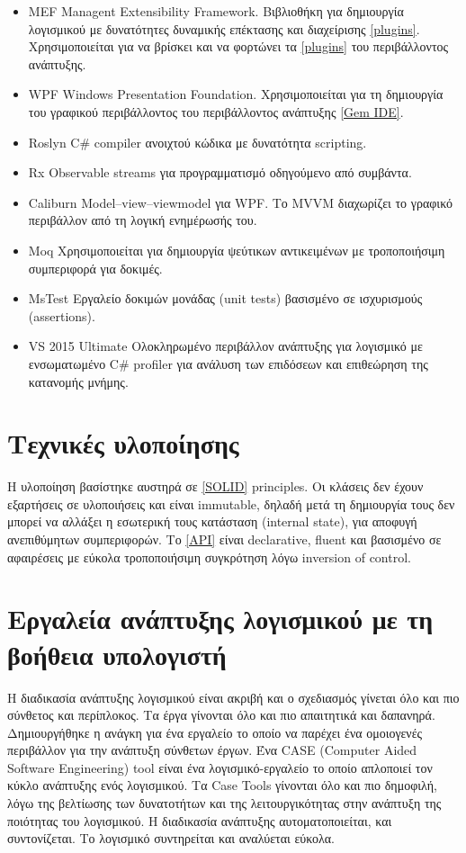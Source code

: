 \begin{itemize}
	\item{MEF} Managent Extensibility Framework. Βιβλιοθήκη για δημιουργία λογισμικού με δυνατότητες δυναμικής επέκτασης και διαχείρισης \ref{plugins}. Χρησιμοποιείται για να βρίσκει και να φορτώνει τα \ref{plugins} του περιβάλλοντος ανάπτυξης.
	\item{WPF} Windows Presentation Foundation. Χρησιμοποιείται για τη δημιουργία του γραφικού περιβάλλοντος του περιβάλλοντος ανάπτυξης \ref{Gem IDE}.
	\item{Roslyn} C\# compiler ανοιχτού κώδικα με δυνατότητα scripting.
	\item{Rx} Observable streams για προγραμματισμό οδηγούμενο από συμβάντα.
	\item{Caliburn} Model–view–viewmodel για WPF. Το MVVM διαχωρίζει το γραφικό περιβάλλον από τη λογική ενημέρωσής του.
	\item{Moq} Χρησιμοποιείται για δημιουργία ψεύτικων αντικειμένων με τροποποιήσιμη συμπεριφορά για δοκιμές.
	\item{MsTest} Εργαλείο δοκιμών μονάδας (unit tests) βασισμένο σε ισχυρισμούς (assertions).
	\item{VS 2015 Ultimate} Ολοκληρωμένο περιβάλλον ανάπτυξης για λογισμικό με ενσωματωμένο C\# profiler για ανάλυση των επιδόσεων και επιθεώρηση της κατανομής μνήμης.
\end{itemize}

\section{Τεχνικές υλοποίησης}
Η υλοποίηση βασίστηκε αυστηρά σε \ref{SOLID} principles. Οι κλάσεις δεν έχουν εξαρτήσεις σε υλοποιήσεις και είναι immutable, δηλαδή μετά τη δημιουργία τους δεν μπορεί να αλλάξει η εσωτερική τους κατάσταση (internal state), για αποφυγή ανεπιθύμητων συμπεριφορών. Το \ref{API} είναι declarative, fluent και βασισμένο σε αφαιρέσεις με εύκολα τροποποιήσιμη συγκρότηση λόγω inversion of control.

\section{Εργαλεία ανάπτυξης λογισμικού με τη βοήθεια υπολογιστή}
Η διαδικασία ανάπτυξης λογισμικού είναι ακριβή και ο σχεδιασμός γίνεται όλο και πιο σύνθετος και περίπλοκος. Τα έργα γίνονται όλο και πιο απαιτητικά και δαπανηρά. Δημιουργήθηκε η ανάγκη για ένα εργαλείο το οποίο να παρέχει ένα ομοιογενές περιβάλλον για την ανάπτυξη σύνθετων έργων. 
Ένα CASE (Computer Aided Software Engineering) tool είναι ένα λογισμικό-εργαλείο το οποίο απλοποιεί τον κύκλο ανάπτυξης ενός λογισμικού. Τα Case Tools γίνονται όλο και πιο δημοφιλή, λόγω της βελτίωσης των δυνατοτήτων και της λειτουργικότητας στην ανάπτυξη της ποιότητας του λογισμικού. Η διαδικασία ανάπτυξης αυτοματοποιείται, και συντονίζεται. Το λογισμικό συντηρείται και αναλύεται εύκολα. 

